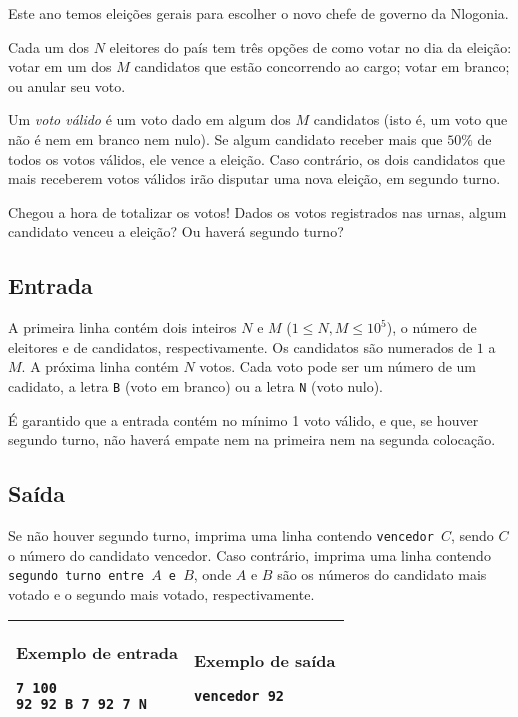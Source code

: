 Este ano temos eleições gerais para escolher o novo chefe de governo da Nlogonia.

Cada um dos $N$ eleitores do país tem três opções de como
votar no dia da eleição: votar em um dos $M$
candidatos que estão concorrendo ao cargo; votar em branco; ou anular seu
voto.

Um \textit{voto válido} é um voto dado em algum dos $M$ candidatos (isto é, um voto
que não é nem em branco nem nulo). Se algum candidato receber mais que $50\%$
de todos os votos válidos, ele vence a eleição. Caso contrário,
os dois candidatos que mais receberem votos válidos irão disputar uma nova
eleição, em segundo turno.

Chegou a hora de totalizar os votos! Dados os votos registrados nas urnas, algum
candidato venceu a eleição? Ou haverá segundo turno?

\subsection*{Entrada}

A primeira linha contém dois inteiros $N$ e $M$
($1 \leq N, M \leq 10^5$), o número de eleitores e de candidatos,
respectivamente. Os candidatos são numerados de $1$ a $M$.
A próxima linha contém $N$ votos. Cada voto pode ser um número de um cadidato, a
letra \verb|B| (voto em branco) ou a letra \verb|N| (voto nulo).

É garantido que a entrada contém no mínimo 1 voto válido, e que, se houver
segundo turno, não haverá empate nem na primeira nem na segunda colocação.

\subsection*{Saída}

Se não houver segundo turno, imprima uma linha contendo
\verb|vencedor |$C$, sendo $C$ o número do candidato vencedor. Caso contrário,
    imprima uma linha contendo \verb|segundo turno entre |$A$\verb| e |$B$, onde
    $A$ e $B$ são os números do candidato mais votado e o segundo mais votado,
    respectivamente.


\begin{table}[!h]
\centering
\begin{tabular}{|l|l|}
\hline
\begin{minipage}[t]{3in}
\textbf{Exemplo de entrada}
\begin{verbatim}
7 100
92 92 B 7 92 7 N
\end{verbatim}
\vspace{1mm}
\end{minipage}
&
\begin{minipage}[t]{3in}
\textbf{Exemplo de saída}
\begin{verbatim}
vencedor 92
\end{verbatim}
\vspace{1mm}
\end{minipage} \\
\hline
\end{tabular}
\end{table}


